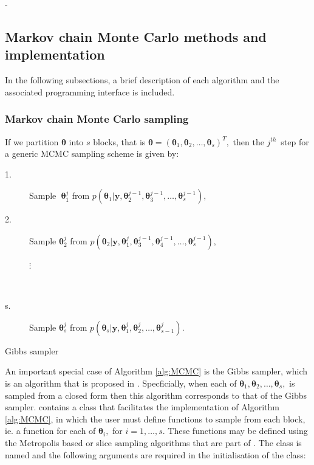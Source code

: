 -\documentclass[article]{jss}
\begin{document}
\subsection{Markov chain Monte Carlo methods and implementation}

In the following subsections, a brief description of each algorithm
and the associated programming interface is included.


\subsubsection{Markov chain Monte Carlo sampling}

If we partition $\bm{\theta}$ into $s$ blocks, that is
$\bm{\bm{\theta}}=\left(\bm{\theta}_{1},\bm{\theta}_{2},\ldots,\bm{\theta}_{s}\right)^{T},$
then the $j^{th}$\ step for a generic MCMC sampling scheme is given
by:

%
\begin{algorithm}[H]
\begin{description}
\item [{\textmd{1.}}] Sample\textbf{\ }$\bm{\theta}_{1}^{j}$ from $p\left(\bm{\theta}_{1}|\bm{y,}\bm{\theta}_{2}^{j-1},\bm{\theta}_{3}^{j-1},\ldots,\bm{\theta}_{s}^{j-1}\right),$ 
\item [{\textmd{2.}}] Sample $\bm{\theta}_{2}^{j}$ from $p\left(\bm{\theta}_{2}|\bm{y,}\bm{\theta}_{1}^{j},\bm{\theta}_{3}^{j-1},\bm{\theta}_{4}^{j-1},\ldots,\bm{\theta}_{s}^{j-1}\right),$

\begin{description}
\item [{$\vdots$}]~
\end{description}
\item [{\textmd{s.}}] Sample $\bm{\theta}_{s}^{j}$ from $p\left(\bm{\theta}_{s}|\bm{y,}\bm{\theta}_{1}^{j},\bm{\theta}_{2}^{j},\ldots,\bm{\theta}_{s-1}^{j}\right).$ 
\end{description}
\caption{Gibbs sampler}
\label{alg:MCMC}
\end{algorithm}

An important special case of Algorithm \ref{alg:MCMC} is the Gibbs
sampler, which is an algorithm that is proposed in
\citet{GelfandSmith1990}. Specficially, when each of
$\bm{\theta}_{1},\bm{\theta}_{2},\dots,\bm{\theta}_{s},$ is sampled
from a closed form then this algorithm corresponds to that of the
Gibbs sampler.  contains a class that facilitates the
implementation of Algorithm \ref{alg:MCMC}, in which the user must
define functions to sample from each block, ie. a function for each of
$\bm{\theta}_{i},$ for $i=1,\dots,s.$ These functions may be defined
using the Metropolis based or slice sampling algorithms that are part
of . The class is named  and the following
arguments are required in the initialisation of the class:
\end{document}
